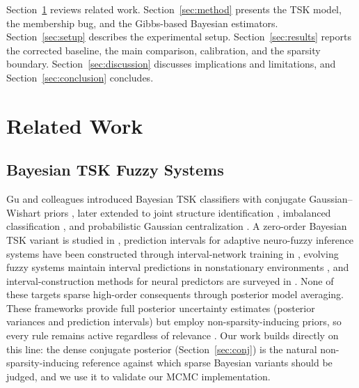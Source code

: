 \documentclass[review,1p,times]{elsarticle}
\begin{document}
Section~\ref{sec:related} reviews related work. Section~\ref{sec:method} presents the TSK model, the membership bug, and the Gibbs-based Bayesian estimators. Section~\ref{sec:setup} describes the experimental setup. Section~\ref{sec:results} reports the corrected baseline, the main comparison, calibration, and the sparsity boundary. Section~\ref{sec:discussion} discusses implications and limitations, and Section~\ref{sec:conclusion} concludes.

\section{Related Work}
\label{sec:related}

\subsection{Bayesian TSK Fuzzy Systems}

Gu and colleagues introduced Bayesian TSK classifiers with conjugate Gaussian--Wishart priors \cite{gu2017bayesian}, later extended to joint structure identification \cite{gu2018bayesian}, imbalanced classification \cite{gu2017imbalanced}, and probabilistic Gaussian centralization \cite{li2025gaussiancentralized}.
A zero-order Bayesian TSK variant is studied in \cite{liu2017bayesianzero}, prediction intervals for adaptive neuro-fuzzy inference systems have been constructed through interval-network training in \cite{miskony2018predictionintervals}, evolving fuzzy systems maintain interval predictions in nonstationary environments \cite{cartagena2024evolving}, and interval-construction methods for neural predictors are surveyed in \cite{khosravi2011comprehensive}.
None of these targets sparse high-order consequents through posterior model averaging. These frameworks provide full posterior uncertainty estimates (posterior variances and prediction intervals) but employ non-sparsity-inducing priors, so every rule remains active regardless of relevance \cite{wang2021bayesian}. Our work builds directly on this line: the dense conjugate posterior (Section~\ref{sec:conj}) is the natural non-sparsity-inducing reference against which sparse Bayesian variants should be judged, and we use it to validate our MCMC implementation.
\end{document}
